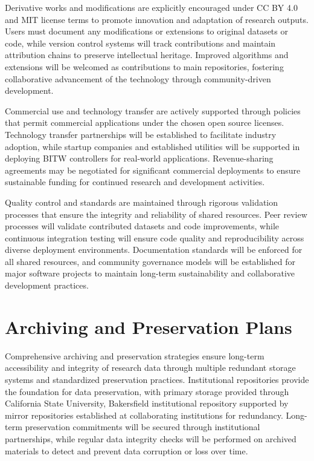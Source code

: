 \documentclass[12pt]{article}
\begin{document}
Derivative works and modifications are explicitly encouraged under CC BY 4.0 and MIT license terms to promote innovation and adaptation of research outputs. Users must document any modifications or extensions to original datasets or code, while version control systems will track contributions and maintain attribution chains to preserve intellectual heritage. Improved algorithms and extensions will be welcomed as contributions to main repositories, fostering collaborative advancement of the technology through community-driven development.

Commercial use and technology transfer are actively supported through policies that permit commercial applications under the chosen open source licenses. Technology transfer partnerships will be established to facilitate industry adoption, while startup companies and established utilities will be supported in deploying BITW controllers for real-world applications. Revenue-sharing agreements may be negotiated for significant commercial deployments to ensure sustainable funding for continued research and development activities.

Quality control and standards are maintained through rigorous validation processes that ensure the integrity and reliability of shared resources. Peer review processes will validate contributed datasets and code improvements, while continuous integration testing will ensure code quality and reproducibility across diverse deployment environments. Documentation standards will be enforced for all shared resources, and community governance models will be established for major software projects to maintain long-term sustainability and collaborative development practices.

\section{Archiving and Preservation Plans}

Comprehensive archiving and preservation strategies ensure long-term accessibility and integrity of research data through multiple redundant storage systems and standardized preservation practices. Institutional repositories provide the foundation for data preservation, with primary storage provided through California State University, Bakersfield institutional repository supported by mirror repositories established at collaborating institutions for redundancy. Long-term preservation commitments will be secured through institutional partnerships, while regular data integrity checks will be performed on archived materials to detect and prevent data corruption or loss over time.
\end{document}
